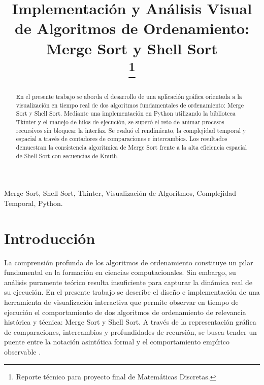 \documentclass[conference]{IEEEtran}
\begin{document}
\title{Implementación y Análisis Visual de Algoritmos de Ordenamiento: Merge Sort y Shell Sort\\
\thanks{Reporte técnico para proyecto final de Matemáticas Discretas.}
}

\author{
}

\maketitle

\begin{abstract}
En el presente trabajo se aborda el desarrollo de una aplicación gráfica orientada a la visualización en tiempo real de dos algoritmos fundamentales de ordenamiento: Merge Sort y Shell Sort. Mediante una implementación en Python utilizando la biblioteca Tkinter y el manejo de hilos de ejecución, se superó el reto de animar procesos recursivos sin bloquear la interfaz. Se evaluó el rendimiento, la complejidad temporal y espacial a través de contadores de comparaciones e intercambios. Los resultados demuestran la consistencia algorítmica de Merge Sort frente a la alta eficiencia espacial de Shell Sort con secuencias de Knuth.
\end{abstract}

\begin{IEEEkeywords}
Merge Sort, Shell Sort, Tkinter, Visualización de Algoritmos, Complejidad Temporal, Python.
\end{IEEEkeywords}

\section{Introducción}
La comprensión profunda de los algoritmos de ordenamiento constituye un pilar fundamental en la formación en ciencias computacionales. Sin embargo, su análisis puramente teórico resulta insuficiente para capturar la dinámica real de su ejecución. En el presente trabajo se describe el diseño e implementación de una herramienta de visualización interactiva que permite observar en tiempo de ejecución el comportamiento de dos algoritmos de ordenamiento de relevancia histórica y técnica: Merge Sort y Shell Sort. A través de la representación gráfica de comparaciones, intercambios y profundidades de recursión, se busca tender un puente entre la notación asintótica formal y el comportamiento empírico observable \cite{cormen_algorithms}.
\end{document}
